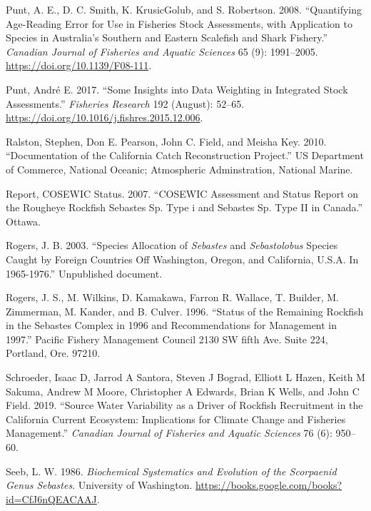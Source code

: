 \documentclass[
]{scrartcl}
\newlength{\cslhangindent}
\newenvironment{CSLReferences}[2] %
 {\begin{list}{}{%
  \setlength{\itemindent}{0pt}
  \setlength{\leftmargin}{0pt}
  \setlength{\parsep}{0pt}
  \ifodd #1
   \setlength{\leftmargin}{\cslhangindent}
   \setlength{\itemindent}{-1\cslhangindent}
  \fi
  \setlength{\itemsep}{#2\baselineskip}}}
 {\end{list}}
\begin{document}
\begin{CSLReferences}{1}{0}
Punt, A. E., D. C. Smith, K. KrusicGolub, and S. Robertson. 2008.
{``Quantifying Age-Reading Error for Use in Fisheries Stock Assessments,
with Application to Species in {A}ustralia's Southern and Eastern
Scalefish and Shark Fishery.''} \emph{Canadian Journal of Fisheries and
Aquatic Sciences} 65 (9): 1991--2005.
\url{https://doi.org/10.1139/F08-111}.

Punt, André E. 2017. {``Some Insights into Data Weighting in Integrated
Stock Assessments.''} \emph{Fisheries Research} 192 (August): 52--65.
\url{https://doi.org/10.1016/j.fishres.2015.12.006}.

Ralston, Stephen, Don E. Pearson, John C. Field, and Meisha Key. 2010.
{``Documentation of the {California} Catch Reconstruction Project.''} US
Department of Commerce, National Oceanic; Atmospheric Adminstration,
National Marine.

Report, COSEWIC Status. 2007. {``COSEWIC Assessment and Status Report on
the Rougheye Rockfish Sebastes Sp. Type i and Sebastes Sp. Type II in
Canada.''} Ottawa.

Rogers, J. B. 2003. {``Species Allocation of \emph{Sebastes} and
\emph{Sebastolobus} Species Caught by Foreign Countries Off
{Washington}, {Oregon}, and {California}, {U}.{S}.{A}. In 1965-1976.''}
Unpublished document.

Rogers, J. S., M. Wilkins, D. Kamakawa, Farron R. Wallace, T. Builder,
M. Zimmerman, M. Kander, and B. Culver. 1996. {``Status of the
{Remaining} {Rockfish} in the {Sebastes} {Complex} in 1996 and
Recommendations for Management in 1997.''} Pacific Fishery Management
Council 2130 SW fifth Ave. Suite 224, Portland, Ore. 97210.

Schroeder, Isaac D, Jarrod A Santora, Steven J Bograd, Elliott L Hazen,
Keith M Sakuma, Andrew M Moore, Christopher A Edwards, Brian K Wells,
and John C Field. 2019. {``Source Water Variability as a Driver of
Rockfish Recruitment in the California Current Ecosystem: Implications
for Climate Change and Fisheries Management.''} \emph{Canadian Journal
of Fisheries and Aquatic Sciences} 76 (6): 950--60.

Seeb, L. W. 1986. \emph{Biochemical {Systematics} and {Evolution} of the
{Scorpaenid} {Genus} {Sebastes}}. University of Washington.
\url{https://books.google.com/books?id=CfJ6nQEACAAJ}.


\end{CSLReferences}
\end{document}
